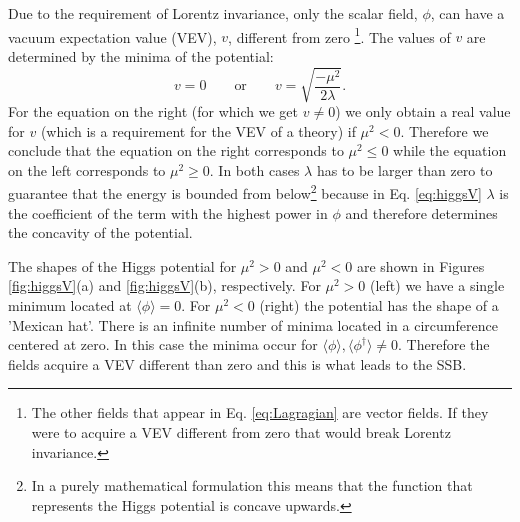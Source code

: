 Due to the requirement of Lorentz invariance, only the scalar field, $\phi$, can have a vacuum expectation value (VEV), $v$, different from zero \footnote{The other fields that appear in Eq. \ref{eq:Lagragian} are vector fields. If they were to acquire a VEV different from zero that would break Lorentz invariance.}. The values of $v$ are determined by the minima of the potential:
\begin{equation}
v=0 \qquad \text{or} \qquad v=\sqrt{\frac{-\mu^2}{2\lambda}}.
\end{equation}
For the equation on the right (for which we get $v\neq 0$) we only obtain a real value for $v$ (which is a requirement for the VEV of a theory) if $\mu^2<0$. Therefore we conclude that the equation on the right corresponds to $\mu^2\leq0$ while the equation on the left corresponds to $\mu^2\geq0$. In both cases $\lambda$ has to be larger than zero to guarantee that the energy is bounded from below\footnote{In a purely mathematical formulation this means that the function that represents the Higgs potential is concave upwards.} because in Eq. \ref{eq:higgsV} $\lambda$ is the coefficient of the term with the highest power in $\phi$ and therefore determines the concavity of the potential. 

The shapes of the Higgs potential for $\mu^2>0$ and $\mu^2<0$ are shown in Figures \ref{fig:higgsV}(a) and \ref{fig:higgsV}(b), respectively. For $\mu^2>0$ (left) we have a single minimum located at $\langle\phi\rangle=0$. For $\mu^2<0$ (right) the potential has the shape of a 'Mexican hat'. There is an infinite number of minima located in a circumference centered at zero. In this case the minima occur for $\langle\phi\rangle,\langle\phi^{\dagger}\rangle\neq 0$. Therefore the fields acquire a VEV different than zero and this is what leads to the SSB.


